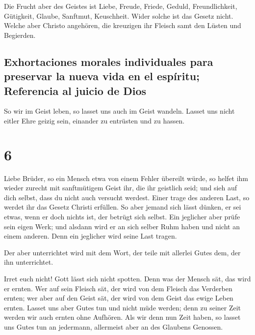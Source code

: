  Die Frucht aber des Geistes ist Liebe, Freude, Friede,
Geduld, Freundlichkeit, Gütigkeit, Glaube, Sanftmut, Keuschheit.
 Wider solche ist das Gesetz nicht. 
Welche aber Christo angehören, die kreuzigen ihr Fleisch samt den Lüsten
und Begierden.

\hypertarget{exhortaciones-morales-individuales-para-preservar-la-nueva-vida-en-el-espuxedritu-referencia-al-juicio-de-dios}{%
\subsection{Exhortaciones morales individuales para preservar la nueva
vida en el espíritu; Referencia al juicio de
Dios}\label{exhortaciones-morales-individuales-para-preservar-la-nueva-vida-en-el-espuxedritu-referencia-al-juicio-de-dios}}

 So wir im Geist leben, so lasset uns auch im Geist
wandeln.  Lasset uns nicht eitler Ehre geizig sein,
einander zu entrüsten und zu hassen.

\hypertarget{section-5}{%
\section{6}\label{section-5}}

 Liebe Brüder, so ein Mensch etwa von einem Fehler
übereilt würde, so helfet ihm wieder zurecht mit sanftmütigem Geist ihr,
die ihr geistlich seid; und sieh auf dich selbst, dass du nicht auch
versucht werdest.  Einer trage des anderen Last, so werdet
ihr das Gesetz Christi erfüllen.  So aber jemand sich
lässt dünken, er sei etwas, wenn er doch nichts ist, der betrügt sich
selbst.  Ein jeglicher aber prüfe sein eigen Werk; und
alsdann wird er an sich selber Ruhm haben und nicht an einem anderen.
 Denn ein jeglicher wird seine Last tragen.

 Der aber unterrichtet wird mit dem Wort, der teile mit
allerlei Gutes dem, der ihn unterrichtet.

 Irret euch nicht! Gott lässt sich nicht spotten. Denn was
der Mensch sät, das wird er ernten.  Wer auf sein Fleisch
sät, der wird von dem Fleisch das Verderben ernten; wer aber auf den
Geist sät, der wird von dem Geist das ewige Leben ernten. 
Lasset uns aber Gutes tun und nicht müde werden; denn zu seiner Zeit
werden wir auch ernten ohne Aufhören.  Als wir denn nun
Zeit haben, so lasset uns Gutes tun an jedermann, allermeist aber an des
Glaubens Genossen.

